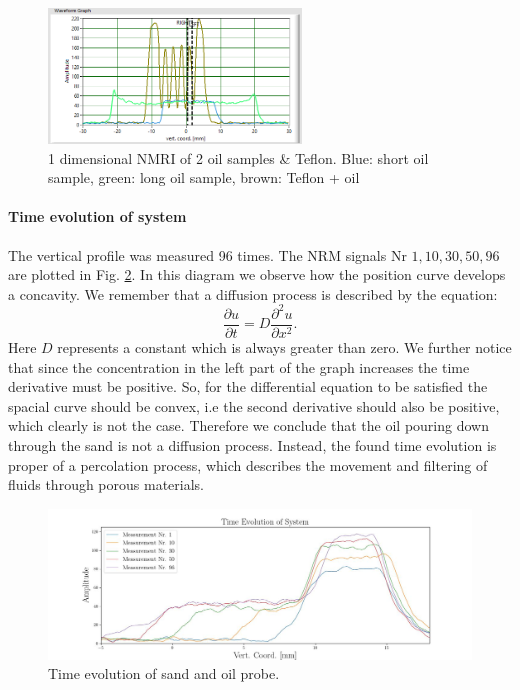 \begin{figure}[!htbp]
  \begin{center}
    \includegraphics[width= 0.6\textwidth]{./Protocol images/III/three_profiles.png}
 \caption{1 dimensional NMRI of 2 oil samples \& Teflon. Blue: short oil sample, green: long oil sample, brown: Teflon + oil}
    \label{fig:teflon}
   \end{center}
 \end{figure} 
\paragraph{Time evolution of system}
The vertical profile was measured 96 times. The NRM signals Nr $ 1,10, 30, 50, 96$ are plotted in Fig. \ref{fig:time evolution system}. In this diagram we observe how the position curve develops a concavity. We remember that a diffusion process is described by the equation:
\begin{equation}
\frac{\partial u}{\partial t} = D\frac{\partial^2 u}{\partial x^2}.
\end{equation}
Here $D$ represents a constant which is always greater than zero. We further notice that since the concentration in the left part of the graph increases the time derivative must be positive. So, for the differential equation to be satisfied the spacial curve should be convex, i.e the second derivative should also be positive, which clearly is not the case. Therefore we conclude that the oil pouring down through the sand is not a diffusion process. Instead, the found time evolution is proper of a percolation process, which describes the movement and filtering of fluids through porous materials. 
\begin{figure}[!htbp]
  \begin{center}
    \includegraphics[width= 1.0\textwidth]{./Latex images/time_evolution.jpg}
 \caption{Time evolution of sand and oil probe.}
    \label{fig:time evolution system}
   \end{center}
 \end{figure}
